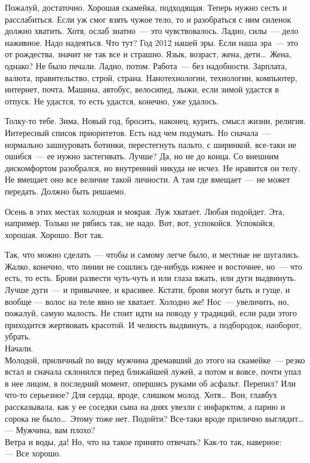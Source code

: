 Пожалуй, достаточно. Хорошая скамейка, подходящая. Теперь нужно сесть и 
расслабиться. Если уж смог взять чужое тело, то и разобраться с ним силенок 
должно хватить. Хотя, ослаб знатно~--- это чувствовалось. Ладно, силы~--- дело 
наживное. Надо надеяться. Что тут? Год 2012 нашей эры. Если наша эра~--- это от 
рождества, значит не так все и страшно. Язык, возраст, жена, дети\ldots\ Жена, 
однако? Не было печали. Ладно, потом. Работа~--- без надобности. Зарплата, 
валюта, 
правительство, строй, страна. Нанотехнологии, технологии, компьютер, интернет, 
почта. Машина, автобус, велосипед, лыжи, если зимой удастся в отпуск. Не 
удастся, то есть удастся, конечно, уже удалось.

Толку-то тебе. Зима, Новый год, бросить, наконец, курить, смысл жизни, религия. 
Интересный список приоритетов. Есть над чем подумать. Но сначала~--- нормально 
зашнуровать ботинки, перестегнуть пальто, с ширинкой, все-таки не ошибся~--- ее 
нужно застегивать. Лучше? Да, но не до конца. Со внешним дискомфортом 
разобрался, но внутренний никуда не исчез. Не нравится он телу. Не вмещает оно 
все величие такой личности. А там где вмещает~--- не может передать. Должно 
быть 
решаемо.

Осень в этих местах холодная и мокрая. Луж хватает. Любая подойдет. Эта, 
например. Только не рябись так, не надо. Вот, вот, успокойся. Успокойся, 
хорошая. Хорошо. Вот так.

Так, что можно сделать~--- чтобы и самому легче было, и местные не шугались. 
Жалко, конечно, что линии не сошлись где-нибудь южнее и восточнее, но~--- что 
есть, то есть. Брови развести чуть-чуть и или глаза вжать, или дуги выдвинуть. 
Лучше дуги~--- и привычнее, и красивее. Кстати, брови могут быть и гуще, и 
вообще 
--- волос на теле явно не хватает. Холодно же! Нос~--- увеличить, но, пожалуй, 
самую 
малость. Не стоит идти на поводу у традиций, если ради этого приходится 
жертвовать красотой. И челюсть выдвинуть, а подбородок, наоборот, убрать.\\

Начали.\\

Молодой, приличный по виду мужчина дремавший до этого на скамейке~--- резко 
встал 
и сначала склонился перед ближайшей лужей, а потом и вовсе, почти упал в нее 
лицом, в последний момент, опершись руками об асфальт. Перепил? Или что-то 
серьезное? Для сердца, вроде, слишком молод. Хотя\ldots\ Вон, главбух рассказывала, 
как у ее соседки сына на днях увезли с инфарктом, а парню и сорока не было\ldots\ 
Этому тоже нет. Подойти? Все-таки вроде прилично выглядит\ldots\\
--- Мужчина, вам плохо?\\
Ветра и воды, да! Но, что на такое принято отвечать? Как-то так, наверное:\\
--- Все хорошо.

